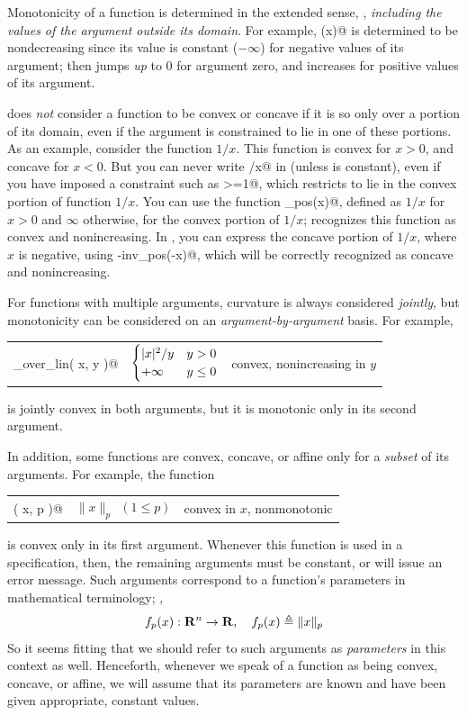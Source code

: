 \documentclass[12pt]{article}
\begin{document}
Monotonicity of a function is determined in the extended sense,
\ie, \emph{including the values of the argument outside its domain}.
For example, \verb@sqrt(x)@ is determined to be nondecreasing since
its value is constant ($-\infty$) 
for negative values of its argument; then jumps \emph{up} to $0$ 
for argument zero, and increases for positive values of its 
argument.

\cvx does \emph{not} consider a function to be
convex or concave if it is so only over a portion of its domain,
even if the argument is constrained to lie in one of these portions.
As an example, consider the function $1/x$.
This function is convex for $x>0$, and concave for $x<0$.
But you can never write /x@ in \cvx (unless \verb@x@ is constant),
even if you have imposed a constraint such as \verb@x>=1@, which restricts
\verb@x@ to lie in the convex portion of function $1/x$.
You can use the \cvx function \verb@inv_pos(x)@, defined as
$1/x$ for $x>0$ and $\infty$ otherwise, for the convex portion of
$1/x$; \cvx recognizes this function as convex and nonincreasing.
In \cvx, you can express the concave portion of $1/x$, 
where $x$ is negative, using \verb@-inv_pos(-x)@, which will be correctly
recognized as concave and nonincreasing.

For functions with multiple arguments,
curvature is always considered \emph{jointly}, but monotonicity
can be considered on an \emph{argument-by-argument} basis. For example,
\begin{center}
\begin{tabular}{lll}
	\verb@quad_over_lin( x, y )@ & $\begin{cases} |x|^2/y&y> 0\\+\infty&y\leq 0 \end{cases}$ & convex, nonincreasing in $y$
\end{tabular}
\end{center}
is jointly convex in both arguments, but it is monotonic 
only in its second argument.

In addition, some functions are convex, concave, or affine only for 
a \emph{subset} of its arguments. For example, the function
\begin{center}
\begin{tabular}{lll}
	\verb@norm( x, p )@ & $\|x\|_p~~(1 \leq p)$ & convex in $x$, nonmonotonic
\end{tabular}
\end{center}
is convex only in its first argument. Whenever this function is used
in a \cvx specification, then, the remaining
arguments must be constant, or \cvx will issue an error message. Such arguments
correspond to a function's parameters in mathematical terminology; \eg,
\begin{equation*}
	f_p(x):\R^n\rightarrow\R, \quad f_p(x) \triangleq \|x\|_p
\end{equation*}
So it seems fitting that we should refer to such arguments as \emph{parameters}
in this context as well. Henceforth, whenever we speak of a \cvx function
as being convex, concave, or affine, we will assume that its parameters are
known and have been given appropriate, constant values.
\end{document}
